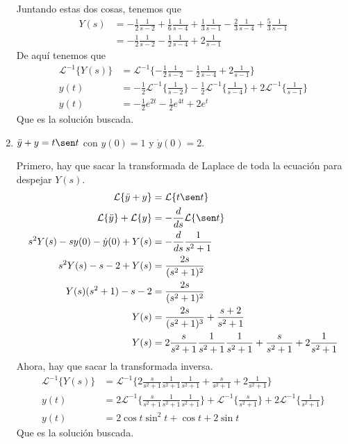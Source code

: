\documentclass{article}
\begin{document}
\begin{enumerate}
{        	Juntando estas dos cosas, tenemos que 
        	\begin{align*}
        	Y(s) &= -\frac{1}{2} \frac{1}{s-2} + \frac{1}{6} \frac{1}{s-4}
        	+ \frac{1}{3} \frac{1}{s-1} - \frac{2}{3} \frac{1}{s-4} 
        	+ \frac{5}{3} \frac{1}{s-1} \\
        	&= -\frac{1}{2} \frac{1}{s-2} - \frac{1}{2}\frac{1}{s-4} 
        	+ 2\frac{1}{s-1}
        	\end{align*}
        	De aquí tenemos que 
        	\begin{align*}
        	\mathcal{L}^{-1}\{Y(s)\} &= \mathcal{L}^{-1}\{-\frac{1}{2} \frac{1}{s-2} 
        	- \frac{1}{2}\frac{1}{s-4} + 2\frac{1}{s-1}\} \\
        	y(t) &= -\frac{1}{2}\mathcal{L}^{-1}\{\frac{1}{s-2}\}
        	-\frac{1}{2}\mathcal{L}^{-1}\{\frac{1}{s-4}\}
        	+2\mathcal{L}^{-1}\{\frac{1}{s-1}\} \\
        	y(t) &= -\frac{1}{2}e^{2t}-\frac{1}{2}e^{4t}+2e^{t}
        	\end{align*}
        	Que es la solución buscada.
        }
        
        \item {
        	$\ddot y + y = t\sen t$ con $y(0) = 1$ y  $\dot y(0) = 2$.
        	
        	\color{azul}
        	Primero, hay que sacar la transformada de Laplace de toda la
        	ecuación para despejar $Y(s)$.
        	\begin{align*}
        	\mathcal{L}\{\ddot y + y\} &= \mathcal{L}\{t\sen t\} \\
        	\mathcal{L}\{\ddot y\} + \mathcal{L}\{y\}
        	&= -\frac{d}{ds}\mathcal{L}\{\sen t\}\\
        	s^2 Y(s) - s y(0) - \dot y(0) + Y(s) 
        	&= -\frac{d}{ds}\frac{1}{s^2+1}\\
        	s^2 Y(s) - s - 2 + Y(s) &= \frac{2s}{(s^2+1)^2} \\
        	Y(s) (s^2+1) - s - 2 &= \frac{2s}{(s^2+1)^2}\\
        	Y(s) &= \frac{2s}{(s^2+1)^3} + \frac{s+2}{s^2+1} \\
        	Y(s) &= 2\frac{s}{s^2+1}\frac{1}{s^2+1}\frac{1}{s^2+1}
        	+ \frac{s}{s^2+1} + 2\frac{1}{s^2+1}
        	\end{align*}
        	Ahora, hay que sacar la transformada inversa.
        	\begin{align*}
        	\mathcal{L}^{-1}\{Y(s)\} 
        	&= \mathcal{L}^{-1}\{
        	2\frac{s}{s^2+1}\frac{1}{s^2+1}\frac{1}{s^2+1}
        	+ \frac{s}{s^2+1} + 2\frac{1}{s^2+1}
        	\} \\
        	y(t) &= 2\mathcal{L}^{-1}\{\frac{s}{s^2+1}\frac{1}{s^2+1}\frac{1}{s^2+1}\} 
        	+ \mathcal{L}^{-1}\{\frac{s}{s^2+1}\} + 2\mathcal{L}^{-1}\{\frac{1}{s^2+1}\}
        	\\
        	y(t) &= 2\cos{t}\sin^{2}{t} + \cos{t} + 2\sin{t}
        	\end{align*}
        	Que es la solución buscada.\\
        }
        

\end{enumerate}
\end{document}
